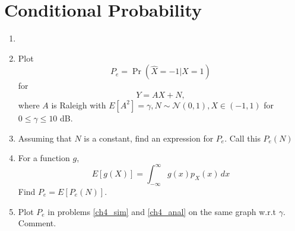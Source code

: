 \documentclass[journal,12pt,twocolumn]{IEEEtran}
\renewcommand\thesection{\arabic{section}}
\providecommand{\pr}[1]{\ensuremath{\Pr\left(#1\right)}}
\providecommand{\sbrak}[1]{\ensuremath{{}\left[#1\right]}}
\providecommand{\brak}[1]{\ensuremath{\left(#1\right)}}
\theoremstyle{remark}
\providecommand{\gauss}[2]{\mathcal{N}\ensuremath{\left(#1,#2\right)}}
\numberwithin{equation}{section}
\begin{document}
\section{Conditional Probability}
\begin{enumerate}[label=\thesection.\arabic*
,ref=\thesection.\theenumi]
\item
\item
\label{ch4_sim}
Plot 
\begin{equation}
P_e = \pr{\hat{X} = -1|X=1}
\end{equation}
%
for 
\begin{equation}
Y = AX+N,
\end{equation}
where $A$ is Raleigh with $E\sbrak{A^2} = \gamma, N \sim \gauss{0}{1}, X \in \brak{-1,1}$ for $0 \le \gamma \le 10$ dB.
%
\item
Assuming that $N$ is a constant, find an expression for $P_e$.  Call this $P_e(N)$
%
\item
%
\label{ch4_anal}
For a function $g$,
\begin{equation}
E\sbrak{g(X)} = \int_{-\infty}^{\infty}g(x)p_{X}(x)\, dx
\end{equation}
%
Find $P_e = E\sbrak{P_e(N)}$.
%
\item
Plot $P_e$ in problems \ref{ch4_sim} and \ref{ch4_anal} on the same graph w.r.t $\gamma$.  Comment.
		\end{enumerate}
\end{document}
